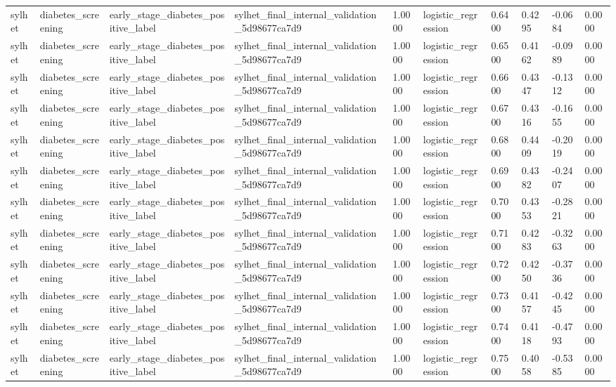 \begin{tabular}{llllllllll}
sylhet & diabetes\_screening & early\_stage\_diabetes\_positive\_label & sylhet\_final\_internal\_validation\_5d98677ca7d9 & 1.0000 & logistic\_regression & 0.6400 & 0.4295 & -0.0684 & 0.0000 \\
sylhet & diabetes\_screening & early\_stage\_diabetes\_positive\_label & sylhet\_final\_internal\_validation\_5d98677ca7d9 & 1.0000 & logistic\_regression & 0.6500 & 0.4162 & -0.0989 & 0.0000 \\
sylhet & diabetes\_screening & early\_stage\_diabetes\_positive\_label & sylhet\_final\_internal\_validation\_5d98677ca7d9 & 1.0000 & logistic\_regression & 0.6600 & 0.4347 & -0.1312 & 0.0000 \\
sylhet & diabetes\_screening & early\_stage\_diabetes\_positive\_label & sylhet\_final\_internal\_validation\_5d98677ca7d9 & 1.0000 & logistic\_regression & 0.6700 & 0.4316 & -0.1655 & 0.0000 \\
sylhet & diabetes\_screening & early\_stage\_diabetes\_positive\_label & sylhet\_final\_internal\_validation\_5d98677ca7d9 & 1.0000 & logistic\_regression & 0.6800 & 0.4409 & -0.2019 & 0.0000 \\
sylhet & diabetes\_screening & early\_stage\_diabetes\_positive\_label & sylhet\_final\_internal\_validation\_5d98677ca7d9 & 1.0000 & logistic\_regression & 0.6900 & 0.4382 & -0.2407 & 0.0000 \\
sylhet & diabetes\_screening & early\_stage\_diabetes\_positive\_label & sylhet\_final\_internal\_validation\_5d98677ca7d9 & 1.0000 & logistic\_regression & 0.7000 & 0.4353 & -0.2821 & 0.0000 \\
sylhet & diabetes\_screening & early\_stage\_diabetes\_positive\_label & sylhet\_final\_internal\_validation\_5d98677ca7d9 & 1.0000 & logistic\_regression & 0.7100 & 0.4283 & -0.3263 & 0.0000 \\
sylhet & diabetes\_screening & early\_stage\_diabetes\_positive\_label & sylhet\_final\_internal\_validation\_5d98677ca7d9 & 1.0000 & logistic\_regression & 0.7200 & 0.4250 & -0.3736 & 0.0000 \\
sylhet & diabetes\_screening & early\_stage\_diabetes\_positive\_label & sylhet\_final\_internal\_validation\_5d98677ca7d9 & 1.0000 & logistic\_regression & 0.7300 & 0.4157 & -0.4245 & 0.0000 \\
sylhet & diabetes\_screening & early\_stage\_diabetes\_positive\_label & sylhet\_final\_internal\_validation\_5d98677ca7d9 & 1.0000 & logistic\_regression & 0.7400 & 0.4118 & -0.4793 & 0.0000 \\
sylhet & diabetes\_screening & early\_stage\_diabetes\_positive\_label & sylhet\_final\_internal\_validation\_5d98677ca7d9 & 1.0000 & logistic\_regression & 0.7500 & 0.4058 & -0.5385 & 0.0000 \\

\end{tabular}
